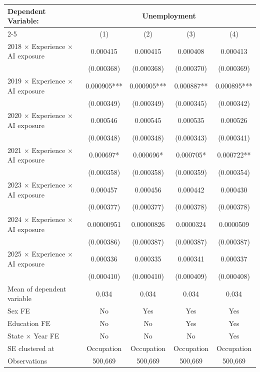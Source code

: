 \def\sym#1{\ifmmode^{#1}\else\(^{#1}\)\fi}
\begin{tabular}{l*{4}{c}}
\toprule
Dependent Variable: & \multicolumn{4}{c}{Unemployment} \\
\cmidrule(lr){2-5}
 & (1) & (2) & (3) & (4) \\
\midrule
2018 $\times$ Experience $\times$ AI exposure&    0.000415   &    0.000415   &    0.000408   &    0.000413   \\
            &  (0.000368)   &  (0.000368)   &  (0.000370)   &  (0.000369)   \\
2019 $\times$ Experience $\times$ AI exposure&    0.000905***&    0.000905***&    0.000887** &    0.000895***\\
            &  (0.000349)   &  (0.000349)   &  (0.000345)   &  (0.000342)   \\
2020 $\times$ Experience $\times$ AI exposure&    0.000546   &    0.000545   &    0.000535   &    0.000526   \\
            &  (0.000348)   &  (0.000348)   &  (0.000343)   &  (0.000341)   \\
2021 $\times$ Experience $\times$ AI exposure&    0.000697*  &    0.000696*  &    0.000705*  &    0.000722** \\
            &  (0.000358)   &  (0.000358)   &  (0.000359)   &  (0.000354)   \\
2023 $\times$ Experience $\times$ AI exposure&    0.000457   &    0.000456   &    0.000442   &    0.000430   \\
            &  (0.000377)   &  (0.000377)   &  (0.000378)   &  (0.000378)   \\
2024 $\times$ Experience $\times$ AI exposure&  0.00000951   &  0.00000826   &   0.0000324   &   0.0000509   \\
            &  (0.000386)   &  (0.000387)   &  (0.000387)   &  (0.000387)   \\
2025 $\times$ Experience $\times$ AI exposure&    0.000336   &    0.000335   &    0.000341   &    0.000337   \\
            &  (0.000410)   &  (0.000410)   &  (0.000409)   &  (0.000408)   \\
\midrule
Mean of dependent variable&       0.034   &       0.034   &       0.034   &       0.034   \\
Sex FE      &          No   &         Yes   &         Yes   &         Yes   \\
Education FE&          No   &          No   &         Yes   &         Yes   \\
State $\times$ Year FE&          No   &          No   &          No   &         Yes   \\
SE clustered at&  Occupation   &  Occupation   &  Occupation   &  Occupation   \\
Observations&     500,669   &     500,669   &     500,669   &     500,669   \\
\bottomrule
\end{tabular}
